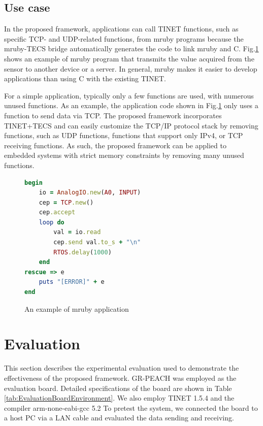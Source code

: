 \documentclass[JIP]{ipsj_v2/UTF8/ipsj}
\begin{document}
\subsection{Use case}
\label{sec:UseCase}

In the proposed framework, applications can call TINET functions, such as specific TCP- and UDP-related functions, from mruby programs because the mruby-TECS bridge automatically generates the code to link mruby and C.
Fig.\ref{src:mruby} shows an example of mruby program that transmits the value acquired from the sensor to another device or a server.
In general, mruby makes it easier to develop applications than using C with the existing TINET.

For a simple application, typically only a few functions are used, with numerous unused functions.
As an example, the application code shown in Fig.\ref{src:mruby} only uses a function to send data via TCP.
The proposed framework incorporates TINET+TECS and can easily customize the TCP/IP protocol stack by removing functions, such as UDP functions, functions that support only IPv4, or TCP receiving functions.
As such, the proposed framework can be applied to embedded systems with strict memory constraints by removing many unused functions.


\begin{figure}[t]
\centering
\begin{lstlisting}[language=Ruby]
begin
    io = AnalogIO.new(A0, INPUT)
    cep = TCP.new()	
    cep.accept
    loop do		
        val = io.read  
        cep.send val.to_s + "\n"		
        RTOS.delay(1000)			
    end
rescue => e	
    puts "[ERROR]" + e
end
\end{lstlisting}
\caption{An example of mruby application}
\label{src:mruby}
\end{figure}

\section{Evaluation}
\label{sec:Evaluation}

This section describes the experimental evaluation used to demonstrate the effectiveness of the proposed framework.
GR-PEACH was employed as the evaluation board.
Detailed specifications of the board are shown in Table \ref{tab:EvaluationBoardEnvironment}.
We also employ TINET 1.5.4 and the compiler arm-none-eabi-gcc 5.2
To pretest the system, we connected the board to a host PC via a LAN cable and evaluated the data sending and receiving.
\end{document}
